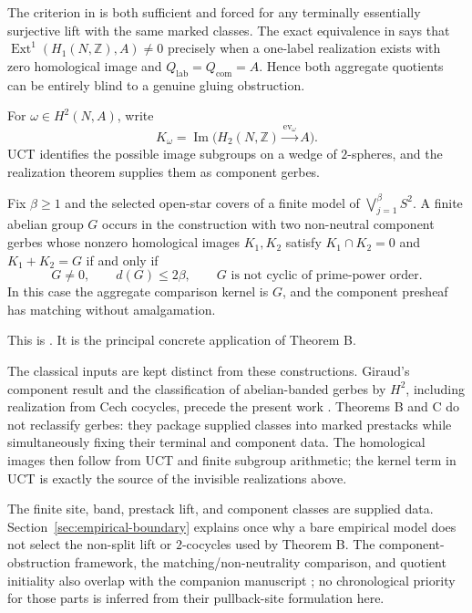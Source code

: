 The criterion in  is both
sufficient and forced for any terminally essentially surjective lift with the
same marked classes.  The exact equivalence in
 says that
\(\operatorname{Ext}^1(H_1(N,\mathbb Z),A)\ne0\) precisely when a one-label
realization exists with zero homological image and
\(Q_{\mathrm{lab}}=Q_{\mathrm{com}}=A\).  Hence both aggregate quotients can
be entirely blind to a genuine gluing obstruction.

For \(\omega\in H^2(N,A)\), write
\[
 K_\omega=\operatorname{Im}
 \bigl(H_2(N,\mathbb Z)\xrightarrow{\operatorname{ev}_\omega}A\bigr).
\]
UCT identifies the possible image subgroups on a wedge of \(2\)-spheres, and
the realization theorem supplies them as component gerbes.

\begin{corollaryD}
Fix \(\beta\ge1\) and the selected open-star covers of a finite model of
\(\bigvee_{j=1}^{\beta}S^2\).  A finite abelian group \(G\) occurs in the
construction with two non-neutral component gerbes whose nonzero homological
images \(K_1,K_2\) satisfy \(K_1\cap K_2=0\) and \(K_1+K_2=G\) if and only
if
\[
 G\ne0,\qquad d(G)\le2\beta,\qquad
 G\text{ is not cyclic of prime-power order}.
\]
In this case the aggregate comparison kernel is \(G\), and the component
presheaf has matching without amalgamation.
\end{corollaryD}

This is .  It is the
principal concrete application of Theorem B.

The classical inputs are kept distinct from these constructions.
Giraud's component result and the classification of abelian-banded gerbes by
\(H^2\), including realization from Cech cocycles, precede the present work
\cite[Chap.~IV]{Giraud1971}\cite{Breen2006,Moerdijk2002}.  Theorems B and C
do not reclassify gerbes: they package supplied classes into marked prestacks
while simultaneously fixing their terminal and component data.  The
homological images then follow from UCT and finite subgroup arithmetic; the
kernel term in UCT is exactly the source of the invisible realizations above.

The finite site, band, prestack lift, and component classes are supplied
data.  Section~\ref{sec:empirical-boundary} explains once why a bare empirical
model does not select the non-split lift or \(2\)-cocycles used by Theorem B.
The component-obstruction framework, the matching/non-neutrality comparison,
and quotient initiality also overlap with the companion manuscript
\cite{MaZhang2026ConditionalGluingFailure}; no chronological priority for
those parts is inferred from their pullback-site formulation here.


